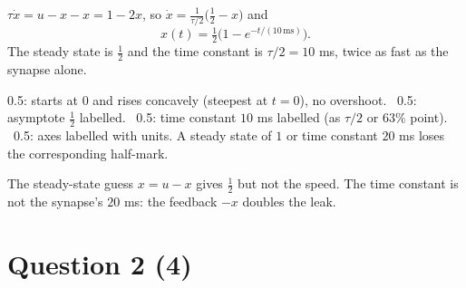 \documentclass[11pt,letterpaper]{article}
\newcommand{\ans}[1]{\par\vspace{4pt}{\bfseries #1}\quad}
\begin{document}
\ans{(b) [2]}
$\tau\dot x = u - x - x = 1 - 2x$, so $\dot x = \frac{1}{\tau/2}\bigl(\tfrac12 - x\bigr)$ and
\[
x(t) = \tfrac12\bigl(1 - e^{-t/(10\,\mathrm{ms})}\bigr).
\]
The steady state is $\tfrac12$ and the time constant is $\tau/2 = 10$ ms, twice as fast as the synapse alone.
\begin{center}
\end{center}
\begin{marking}
0.5: starts at $0$ and rises concavely (steepest at $t = 0$), no overshoot. \ 0.5: asymptote $\tfrac12$ labelled. \ 0.5: time constant $10$ ms labelled (as $\tau/2$ or $63\%$ point). \ 0.5: axes labelled with units. A steady state of $1$ or time constant $20$ ms loses the corresponding half-mark.
\end{marking}
\begin{trap}
The steady-state guess $x = u - x$ gives $\tfrac12$ but not the speed. The time constant is not the synapse's $20$ ms: the feedback $-x$ doubles the leak.
\end{trap}

\section*{Question 2 \hfill (4)}
\end{document}
